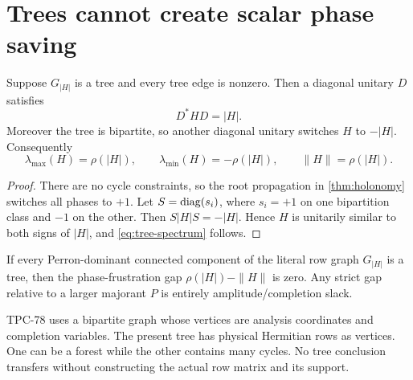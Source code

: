 \section{Trees cannot create scalar phase saving}
\label{sec:trees}

\begin{theorem}\label{thm:tree}
Suppose \(G_{|H|}\) is a tree and every tree edge is nonzero.  Then a
diagonal unitary \(D\) satisfies
\[
 D^*HD=|H|.
\]
Moreover the tree is bipartite, so another diagonal unitary switches
\(H\) to \(-|H|\).  Consequently
\begin{equation}\label{eq:tree-spectrum}
 \lambda_{\max}(H)=\rho(|H|),
 \qquad
 \lambda_{\min}(H)=-\rho(|H|),
 \qquad
 \|H\|=\rho(|H|).
\end{equation}
\end{theorem}

\begin{proof}
There are no cycle constraints, so the root propagation in
\cref{thm:holonomy} switches all phases to \(+1\).  Let
\(S=\operatorname{diag}(s_i)\), where \(s_i=+1\) on one bipartition class and
\(-1\) on the other.  Then \(S|H|S=-|H|\).  Hence \(H\) is unitarily
similar to both signs of \(|H|\), and \eqref{eq:tree-spectrum} follows.
\end{proof}

\begin{corollary}\label{cor:tree-stop}
If every Perron-dominant connected component of the literal row graph
\(G_{|H|}\) is a tree, then the phase-frustration gap
\(\rho(|H|)-\|H\|\) is zero.  Any strict gap relative to a larger
majorant \(P\) is entirely amplitude/completion slack.
\end{corollary}

\begin{remark}
TPC-78 uses a bipartite graph whose vertices are analysis coordinates
and completion variables.  The present tree has physical Hermitian rows
as vertices.  One can be a forest while the other contains many
cycles.  No tree conclusion transfers without constructing the actual
row matrix and its support.
\end{remark}
